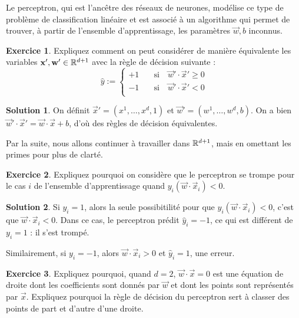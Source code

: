 \documentclass[a4paper,francais]{article}
\newcommand{\R}{{\ensuremath\mathbb{R}}}
\theoremstyle{definition}
\newtheorem{exercice}{Exercice}[section]
\newtheorem*{solution}{Solution}
\begin{document}
Le perceptron, qui est l'ancêtre des réseaux de neurones, modélise ce type
de problème de classification linéaire et est associé à un algorithme qui
permet de trouver, à partir de l'ensemble d'apprentissage, les paramètres
$\vec{w},b$ inconnus. 

\begin{exercice}
  Expliquez comment on peut considérer de manière équivalente
  les variables $\vec{x}', \vec{w}' \in \R^{d+1}$ avec la règle de décision
  suivante :
  \[
  \hat{y} :=
  \left\{
  \begin{array}{ll}
    +1 & \quad \mathrm{si}\quad \vec{w}'\cdot\vec{x}' \geq 0 \\
    -1 & \quad \mathrm{si}\quad \vec{w}'\cdot\vec{x}' < 0 \\
  \end{array}
  \right.
  \]
\end{exercice}

\begin{solution}
  On définit $\vec{x}' = (x^1, \dots, x^d, 1)$ et
  $\vec{w}' = (w^1, \dots, w^d, b)$. On a bien
  $\vec{w}'\cdot\vec{x}' = \vec{w}\cdot\vec{x} + b$,
  d'où des règles de décision équivalentes. 
\end{solution}

Par la suite, nous allons continuer à travailler dans $\R^{d+1}$,
mais en omettant les primes pour plus de clarté. 

\begin{exercice}
  Expliquez pourquoi on considère que le perceptron se trompe pour le cas $i$
  de l'ensemble d'apprentissage quand $y_i (\vec{w}\cdot\vec{x}_i) < 0$.
\end{exercice}

\begin{solution}
  Si $y_i = 1$, alors la seule possibitilité pour que
  $y_i (\vec{w}\cdot\vec{x}_i) < 0$, c'est que
  $\vec{w}\cdot\vec{x}_i < 0$. Dans ce cas, le perceptron prédit
  $\hat{y}_i = -1$, ce qui est différent de $y_i = 1$ : il s'est trompé.

  Similairement, si $y_i = -1$, alors $\vec{w}\cdot\vec{x}_i > 0$
  et $\hat{y}_i = 1$, une erreur. 
\end{solution}

\begin{exercice}
  Expliquez pourquoi, quand $d = 2$, $\vec{w}\cdot\vec{x} = 0$
  est une équation de droite dont les coefficients sont donnés
  par $\vec{w}$ et dont les points sont représentés par $\vec{x}$.
  Expliquez pourquoi la règle de décision du perceptron
  sert à classer des points de part et d'autre d'une droite. 
\end{exercice}
\end{document}
